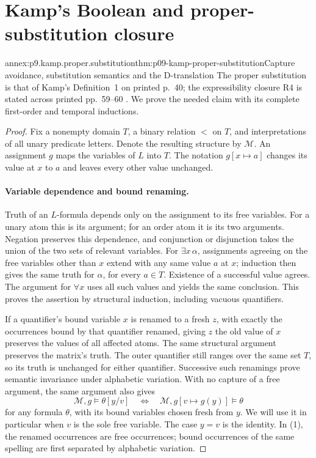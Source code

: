 
\section{Kamp's Boolean and proper-substitution closure}
\label{sec:annex-p09-kamp-iii2-lemma3}

\begin{annexitem}{annex:p9.kamp.proper.substitution}{thm:p09-kamp-proper-substitution}{Capture avoidance, substitution semantics and the D-translation}
The proper substitution is that of Kamp's Definition~1 on printed p.~40;
the expressibility closure R4 is stated across printed pp.~59--60
\cite[ch.~III, pp.~40--42, 59--60]{Kamp1968}. We prove the needed claim
with its complete first-order and temporal inductions.

\begin{proof}
Fix a nonempty domain \(T\), a binary relation \(<\) on \(T\), and
interpretations of all unary predicate letters. Denote the resulting
structure by \(\mathcal M\). An assignment \(g\) maps the variables
of \(L\) into \(T\). The notation \(g[x\mapsto a]\) changes its value
at \(x\) to \(a\) and leaves every other value unchanged.

\paragraph{Variable dependence and bound renaming.}
Truth of an \(L\)-formula depends only on the assignment to its free
variables. For a unary atom this is its argument; for an order atom it
is its two arguments. Negation preserves this dependence, and conjunction
or disjunction takes the union of the two sets of relevant variables.
For \(\exists x\,\alpha\), assignments agreeing on the free variables
other than \(x\) extend with any same value \(a\) at \(x\); induction
then gives the same truth for \(\alpha\), for every \(a\in T\).
Existence of a successful value agrees. The argument for \(\forall x\)
uses all such values and yields the same conclusion. This proves the
assertion by structural induction, including vacuous quantifiers.

If a quantifier's bound variable \(x\) is renamed to a fresh \(z\),
with exactly the occurrences bound by that quantifier renamed, giving
\(z\) the old value of \(x\) preserves the values of all affected
atoms. The same structural argument preserves the matrix's truth. The
outer quantifier still ranges over the same set \(T\), so its truth is
unchanged for either quantifier. Successive such renamings prove semantic
invariance under alphabetic variation. With no capture of a free argument,
the same argument also gives
\[
 \mathcal M,g\models\theta[y/v]
 \quad\Longleftrightarrow\quad
 \mathcal M,g[v\mapsto g(y)]\models\theta
\tag{1}
\]
for any formula \(\theta\), with its bound variables chosen fresh
from \(y\). We will use it in particular when \(v\) is the sole
free variable. The case \(y=v\) is the identity. In (1), the renamed
occurrences are free occurrences;
bound occurrences of the same spelling are first separated by alphabetic
variation.


\end{proof}
\end{annexitem}
